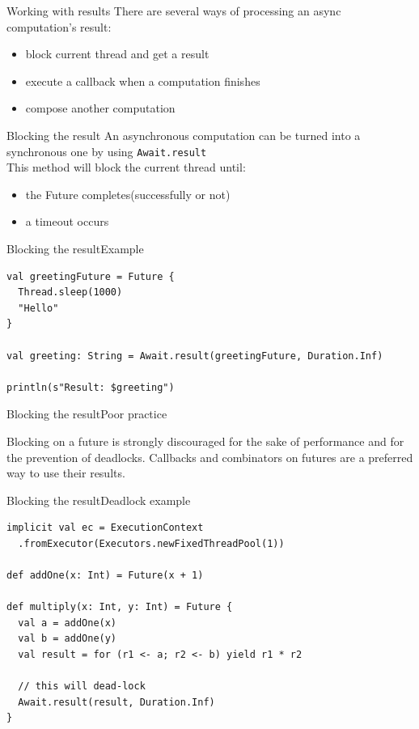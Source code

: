 \documentclass[aspectratio=169]{beamer}
\begin{document}
\begin{frame}{Working with results}
  There are several ways of processing an async computation's result:
  \begin{itemize}
    \item block current thread and get a result
    \item execute a callback when a computation finishes
    \item compose another computation
  \end{itemize}
\end{frame}

\begin{frame}{Blocking the result}
An asynchronous computation can be turned into a synchronous one by 
using \texttt{Await.result}
\medskip
\\This method will block the current thread until:
\begin{itemize}
  \item the Future completes(successfully or not)
  \item a timeout occurs
\end{itemize}
\end{frame}

\begin{frame}[fragile]{Blocking the result}{Example}
\begin{verbatim}
val greetingFuture = Future {
  Thread.sleep(1000) 
  "Hello" 
}

val greeting: String = Await.result(greetingFuture, Duration.Inf)

println(s"Result: $greeting")
\end{verbatim}
\end{frame}

\begin{frame}{Blocking the result}{Poor practice}
  \begin{block}{}
    Blocking on a future is strongly discouraged for the sake of performance and for the prevention of
    deadlocks. Callbacks and combinators on futures are a preferred way to use their results.
  \end{block}
\end{frame}

\begin{frame}[fragile]{Blocking the result}{Deadlock example}
\begin{verbatim}
implicit val ec = ExecutionContext
  .fromExecutor(Executors.newFixedThreadPool(1))

def addOne(x: Int) = Future(x + 1)

def multiply(x: Int, y: Int) = Future {
  val a = addOne(x)
  val b = addOne(y)
  val result = for (r1 <- a; r2 <- b) yield r1 * r2

  // this will dead-lock
  Await.result(result, Duration.Inf)
}
\end{verbatim}
\end{frame}
\end{document}
